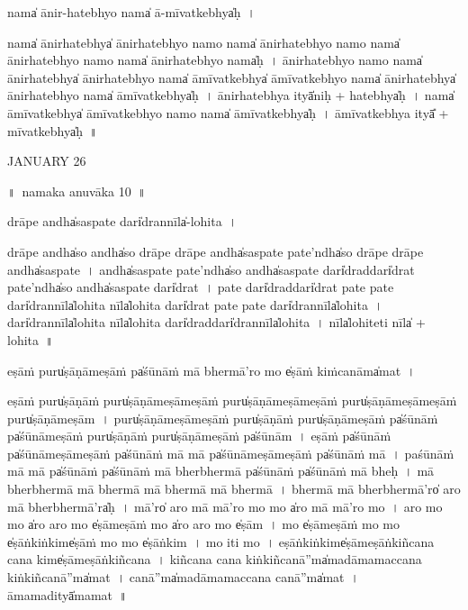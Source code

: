 \documentclass[parskip, DIV=14]{scrartcl}
\begin{document}
{nama̍ ānir-ha॒tebhyo॒ nama̍ ā-mīva॒tkebhya̍ḥ~।

nama̍ ānirha॒tebhya̍ ānirha॒tebhyo॒ namo॒ nama̍ ānirha॒tebhyo॒ namo॒ nama̍ ānirha॒tebhyo॒ namo॒ nama̍ ānirha॒tebhyo॒ nama̍ḥ~।
ā॒ni॒rha॒tebhyo॒ namo॒ nama̍ ānirha॒tebhya̍ ānirha॒tebhyo॒ nama̍ āmīva॒tkebhya̍ āmīva॒tkebhyo॒ nama̍ ānirha॒tebhya̍ ānirha॒tebhyo॒ nama̍ āmīva॒tkebhya̍ḥ~।
ā॒ni॒rha॒tebhya॒ ityā̍niḥ + ha॒tebhya̍ḥ~। %
nama̍ āmīva॒tkebhya̍ āmīva॒tkebhyo॒ namo॒ nama̍ āmīva॒tkebhya̍ḥ~।
ā॒mī॒va॒tkebhya॒ ityā̎ + mī॒va॒tkebhya̍ḥ~॥ 


JANUARY 26

\newpage
\LARGE
॥~namaka anuvāka 10~॥ 
\Large


drāpe॒ andha̍saspate॒ dari̍dra॒nnīla̍-lohita~।

drāpe॒ andha̍so॒ andha̍so॒ drāpe॒ drāpe॒ andha̍saspate pa॒te'ndha̍so॒ drāpe॒ drāpe॒ andha̍saspate~।
andha̍saspate pa॒te'ndha̍so॒ andha̍saspate॒ dari̍dra॒ddari̍drat pa॒te'ndha̍so॒ andha̍saspate॒ dari̍drat~।
pa॒te॒ dari̍dra॒ddari̍drat pate pate॒ dari̍dra॒nnīla̍lohita॒ nīla̍lohita॒ dari̍drat pate pate॒ dari̍dra॒nnīla̍lohita~।
dari̍dra॒nnīla̍lohita॒ nīla̍lohita॒ dari̍dra॒ddari̍dra॒nnīla̍lohita~।
nīla̍lohi॒teti॒ nīla̍ + lo॒hi॒ta॒~॥ 

e॒ṣāṁ puru̍ṣāṇāme॒ṣāṁ pa̍śū॒nāṁ mā bhermā'ro॒ mo e̍ṣā॒ṁ kiṁca॒nāma̍mat~।

e॒ṣāṁ puru̍ṣāṇā॒ṁ puru̍ṣāṇāme॒ṣāme॒ṣāṁ  puru̍ṣāṇāme॒ṣāme॒ṣāṁ puru̍ṣāṇāme॒ṣāme॒ṣāṁ  puru̍ṣāṇāme॒ṣām~।
puru̍ṣāṇāme॒ṣāme॒ṣāṁ puru̍ṣāṇā॒ṁ puru̍ṣāṇāme॒ṣāṁ pa̍śū॒nāṁ pa̍śū॒nāme॒ṣāṁ puru̍ṣāṇā॒ṁ puru̍ṣāṇāme॒ṣāṁ pa̍śū॒nām~।
e॒ṣāṁ pa̍śū॒nāṁ pa̍śū॒nāme॒ṣāme॒ṣāṁ pa̍śū॒nāṁ mā mā pa̍śū॒nāme॒ṣāme॒ṣāṁ pa̍śū॒nāṁ mā~।
pa॒śū॒nāṁ mā mā pa̍śū॒nāṁ pa̍śū॒nāṁ mā bherbhermā pa̍śū॒nāṁ pa̍śū॒nāṁ mā bheḥ~।
mā bherbhermā mā bhermā mā bhermā mā bhermā~।
bhermā mā bherbhermā'ro̍ aro॒ mā bherbhermā'ra̍ḥ~।
mā'ro̍ aro॒ mā mā'ro॒ mo mo a̍ro॒ mā mā'ro॒ mo~। %
a॒ro॒ mo mo a̍ro aro॒ mo e̍ṣāmeṣā॒ṁ mo a̍ro aro॒ mo e̍ṣām~।
mo e̍ṣāmeṣā॒ṁ mo mo e̍ṣā॒ṅkiṅkime̍ṣā॒ṁ mo mo e̍ṣā॒ṅkim~।
mo iti॒ mo~।
e॒ṣā॒ṅkiṅkime̍ṣāmeṣā॒ṅkiñca॒na ca॒na kime̍ṣāmeṣā॒ṅkiñca॒na~।
kiñca॒na ca॒na kiṅkiñca॒nā''ma̍madāmamacca॒na kiṅkiñca॒nā''ma̍mat~। %
ca॒nā''ma̍madāmamacca॒na ca॒nā''ma̍mat~। %
ā॒ma॒ma॒dityā̍mamat~॥ 
  
}
\end{document}
